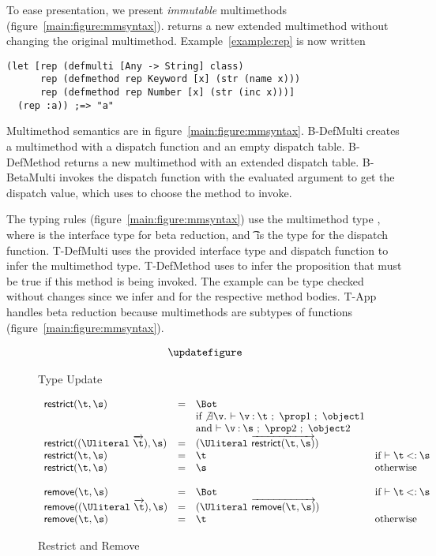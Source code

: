 To ease presentation, we present \emph{immutable}
multimethods (figure~\ref{main:figure:mmsyntax}).  returns a new extended multimethod
without changing the original multimethod. Example~\ref{example:rep} is now written
\begin{verbatim}
(let [rep (defmulti [Any -> String] class)
      rep (defmethod rep Keyword [x] (str (name x)))
      rep (defmethod rep Number [x] (str (inc x)))]
  (rep :a)) ;=> "a"
\end{verbatim}

Multimethod semantics are in figure~\ref{main:figure:mmsyntax}.
B-DefMulti creates a multimethod with a dispatch function and an empty dispatch table.
B-DefMethod returns a new multimethod with an extended dispatch table.
B-BetaMulti invokes the dispatch function with the evaluated argument to get the dispatch value,
which \getmethodliteral{} uses to choose the method to invoke.

The typing rules (figure~\ref{main:figure:mmsyntax}) use the multimethod type {\MultiFntype{\s{}}{\t{}}}, 
where \s{} is the interface type for beta reduction, and \t{} is the type for
the dispatch function. T-DefMulti uses the provided interface type and dispatch function
to infer the multimethod type. T-DefMethod uses \isacompareliteral{} to infer the proposition
that must be true if this method is being invoked. The example can be type checked without
changes since we infer \isprop{\Number}{\x{}} and \isprop{\Keyword}{\x{}} for the respective
method bodies. T-App handles beta reduction because multimethods are subtypes of functions
(figure~\ref{main:figure:mmsyntax}).



\begin{figure*}
  $$
\begin{array}{lllll}
\updatefigure
\end{array}
$$
\caption{Type Update}
\label{main:figure:update}
\end{figure*}

\begin{figure}
  $$
\begin{array}{lllll}
  \restrictremovefigure{}
\end{array}
  $$
  \caption{Restrict and Remove}
  \label{main:figure:restrictremove}
\end{figure}
